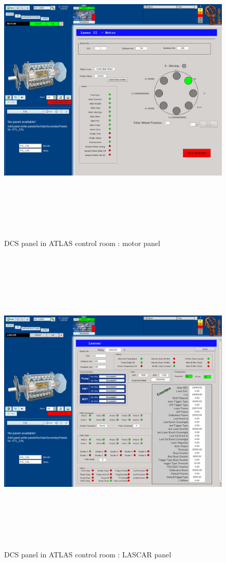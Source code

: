\begin{appendices}
\begin{figure}[htbp]
\centering
\includegraphics[width=14cm,height=15cm]{figures/dcs_cr_motor.png}
\caption{DCS panel in ATLAS control room : motor panel}\label{fig:dcs_cr_d}
\end{figure}

\begin{figure}[htbp]
\centering
\includegraphics[width=14cm,height=15cm]{figures/dcs_cr_lascar.png}
\caption{DCS panel in ATLAS control room : LASCAR panel}\label{fig:dcs_cr_e}
\end{figure}

\newpage
\end{appendices}